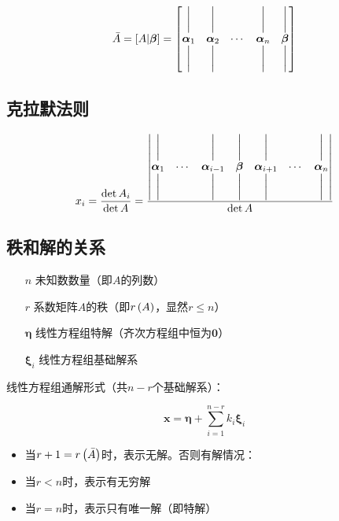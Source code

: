 \documentclass{article}
\begin{document}
\[\def\av{\boldsymbol{\mathrm\alpha}}
    \bar A=
    \left[A|\boldsymbol{\mathrm\beta}\right]=
    \begin{bmatrix}
        \bigg| & \bigg| &        & \bigg| & \bigg|                    \\
        \av_1  & \av_2  & \cdots & \av_n  & \boldsymbol{\mathrm\beta} \\
        \bigg| & \bigg| &        & \bigg| & \bigg|
    \end{bmatrix}\]

\subsection{克拉默法则}

\[\def\av{\boldsymbol{\mathrm\alpha}}
    \def\bv{\boldsymbol{\mathrm\beta}}
    x_i=\frac{\det A_i}{\det A}=\frac{
        \begin{vmatrix}
            \bigg| &        & \bigg|    & \bigg| & \bigg|    &        & \bigg| \\
            \av_1  & \cdots & \av_{i-1} & \bv    & \av_{i+1} & \cdots & \av_n  \\
            \bigg| &        & \bigg|    & \bigg| & \bigg|    &        & \bigg|
        \end{vmatrix}}{\det A}\]

\subsection{秩和解的关系}

\begin{enumerate}
    \item[$n$] 未知数数量（即$A$的列数）
    \item[$r$] 系数矩阵$A$的秩（即$r\left(A\right)$，显然$r\leqslant n$）
    \item[$\boldsymbol\eta$] 线性方程组特解（齐次方程组中恒为$\boldsymbol0$）
    \item[$\boldsymbol\xi_i$] 线性方程组基础解系
\end{enumerate}

线性方程组通解形式（共$n-r$个基础解系）：

\[\boldsymbol x=\boldsymbol\eta+\sum_{i=1}^{n-r}k_i\boldsymbol\xi_i\]

\begin{itemize}
    \item 当$r+1=r\left(\bar A\right)$时，表示无解。否则有解情况：
    \item 当$r<n$时，表示有无穷解
    \item 当$r=n$时，表示只有唯一解（即特解）
\end{itemize}
\end{document}
